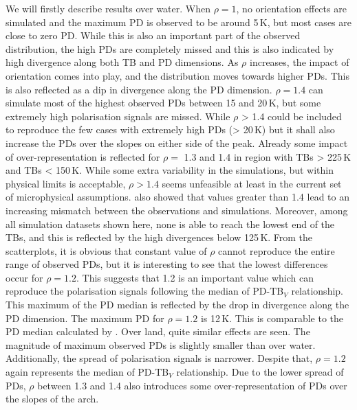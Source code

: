 \documentclass[amt, manuscript]{copernicus}
\begin{document}
We will firstly describe results over water. When $\rho = 1$, no orientation effects are simulated and the maximum PD is observed to be around 5\,K, but most cases are close to zero PD. While this is also an important part of the observed distribution, the high PDs are completely missed and this is also indicated by high divergence along both TB and PD dimensions. As $\rho$ increases, the impact of orientation comes into play, and the distribution moves towards higher PDs. This is also reflected as a dip in divergence along the PD dimension. $\rho = 1.4$ can simulate most of the highest observed PDs between 15 and 20\,K, but some extremely high polarisation signals are missed. While $\rho$ > 1.4  could be included to reproduce the few cases with extremely high PDs (> 20\,K) but it shall also increase the PDs over the slopes on either side of the peak. Already some impact of over-representation is reflected for $\rho =$ 1.3 and 1.4 in region with TBs > 225\,K and TBs < 150\,K. While some extra variability in the simulations, but within physical limits is acceptable, $\rho > 1.4$ seems unfeasible at least in the current set of microphysical assumptions. \citet{barlakas:intro:21} also showed that values greater than 1.4 lead to an increasing mismatch between the observations and simulations.  Moreover, among all simulation datasets shown here, none is able to reach the lowest end of the TBs, and this is reflected by the high divergences below 125\,K. From the scatterplots, it is obvious that constant value of $\rho$ cannot reproduce the entire range of observed PDs, but it is  interesting to see that the lowest differences occur for  $\rho = 1.2$. This suggests that 1.2 is an important value which can reproduce the polarisation signals following the median of PD-TB$_V$ relationship. This maximum of the PD median is reflected by the drop in divergence along the PD dimension. The maximum PD for $\rho = 1.2$ is 12\,K. This is comparable to the PD median calculated by \citet{galligani:param:21}. Over land, quite similar effects are seen. The magnitude of maximum observed PDs is slightly smaller than over water. Additionally, the spread of polarisation signals is narrower. Despite that, $\rho = 1.2$ again represents the median of PD-TB$_{V}$ relationship. Due to the lower spread of PDs, $\rho$ between 1.3 and 1.4 also introduces some over-representation of PDs over the slopes of the arch. 
\end{document}
